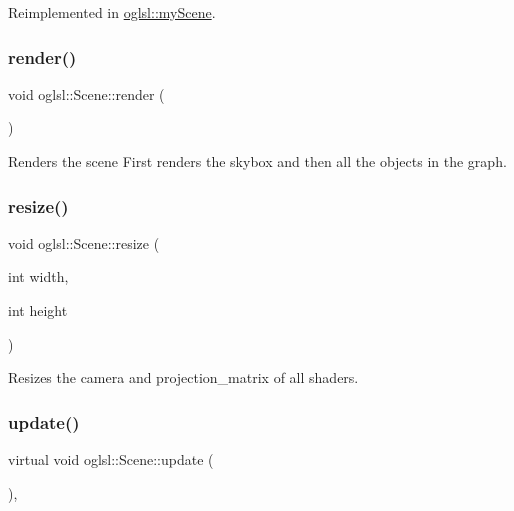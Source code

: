 Reimplemented in \mbox{\hyperlink{classoglsl_1_1my_scene_aeab1e8cfe8c40f6110e1789a74008191}{oglsl\+::my\+Scene}}.

\mbox{\label{classoglsl_1_1_scene_a94b552369f7653c854d38a1553c84288}} 
\subsubsection{\texorpdfstring{render()}{render()}}
{\footnotesize\ttfamily void oglsl\+::\+Scene\+::render (\begin{DoxyParamCaption}{ }\end{DoxyParamCaption})\hspace{0.3cm}{\ttfamily [inline]}}



Renders the scene First renders the skybox and then all the objects in the graph. 

\mbox{\label{classoglsl_1_1_scene_a1eac687cef62ac021bfdd98749aa2ee5}} 
\subsubsection{\texorpdfstring{resize()}{resize()}}
{\footnotesize\ttfamily void oglsl\+::\+Scene\+::resize (\begin{DoxyParamCaption}\item[{int}]{width,  }\item[{int}]{height }\end{DoxyParamCaption})\hspace{0.3cm}{\ttfamily [inline]}}



Resizes the camera and projection\+\_\+matrix of all shaders. 

\mbox{\label{classoglsl_1_1_scene_accbf0c6f23ccd909f63851c0bc547449}} 
\subsubsection{\texorpdfstring{update()}{update()}}
{\footnotesize\ttfamily virtual void oglsl\+::\+Scene\+::update (\begin{DoxyParamCaption}{ }\end{DoxyParamCaption})\hspace{0.3cm}{\ttfamily [inline]}, {\ttfamily [virtual]}}



